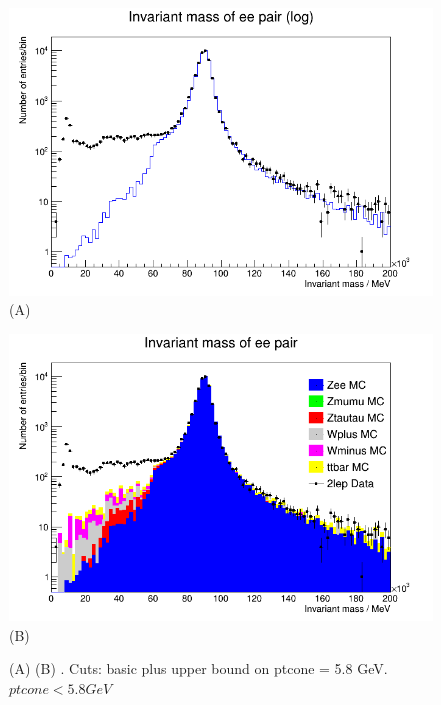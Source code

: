\begin{figure}[h!]
    \centering
    \begin{minipage}{0.5\textwidth}
        \centering
        \includegraphics[width=\linewidth]{plots/02-03-2021/09-35_2Stack.png}
        (A)
    \end{minipage}\hfill
    \begin{minipage}{0.5\textwidth}
        \centering
        \includegraphics[width=\linewidth]{plots/02-03-2021/09-37_AllStack.png}
        (B)
    \end{minipage}
    \caption{(A)  (B) . Cuts: basic plus upper bound on ptcone = 5.8 GeV. $ptcone < 5.8 GeV$}
    \label{fig:09:35_02-03-21}
\end{figure}


